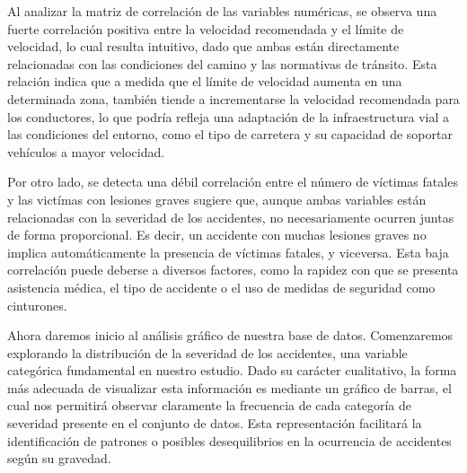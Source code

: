 \documentclass[
  letterpaper,
  DIV=11,
  numbers=noendperiod]{scrartcl}
\begin{document}
Al analizar la matriz de correlación de las variables numéricas, se
observa una fuerte correlación positiva entre la velocidad recomendada y
el límite de velocidad, lo cual resulta intuitivo, dado que ambas están
directamente relacionadas con las condiciones del camino y las
normativas de tránsito. Esta relación indica que a medida que el límite
de velocidad aumenta en una determinada zona, también tiende a
incrementarse la velocidad recomendada para los conductores, lo que
podría refleja una adaptación de la infraestructura vial a las
condiciones del entorno, como el tipo de carretera y su capacidad de
soportar vehículos a mayor velocidad.

Por otro lado, se detecta una débil correlación entre el número de
víctimas fatales y las victímas con lesiones graves sugiere que, aunque
ambas variables están relacionadas con la severidad de los accidentes,
no necesariamente ocurren juntas de forma proporcional. Es decir, un
accidente con muchas lesiones graves no implica automáticamente la
presencia de víctimas fatales, y viceversa. Esta baja correlación puede
deberse a diversos factores, como la rapidez con que se presenta
asistencia médica, el tipo de accidente o el uso de medidas de seguridad
como cinturones.

Ahora daremos inicio al análisis gráfico de nuestra base de datos.
Comenzaremos explorando la distribución de la severidad de los
accidentes, una variable categórica fundamental en nuestro estudio. Dado
su carácter cualitativo, la forma más adecuada de visualizar esta
información es mediante un gráfico de barras, el cual nos permitirá
observar claramente la frecuencia de cada categoría de severidad
presente en el conjunto de datos. Esta representación facilitará la
identificación de patrones o posibles desequilibrios en la ocurrencia de
accidentes según su gravedad.
\end{document}
